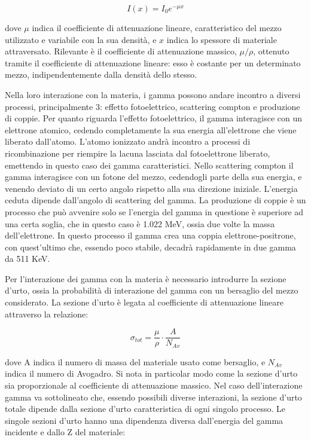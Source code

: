 \documentclass[a4paper,10pt]{article}
\begin{document}
\begin{equation}
	I(x)=I_{0}e^{-\mu x}
\end{equation}

\noindent dove $\mu$ indica il coefficiente di attenuazione lineare, caratteristico del mezzo utilizzato e variabile con la sua densità, e $x$ indica lo spessore di materiale attraversato. Rilevante \`e il coefficiente di attenuazione massico, $\mu/\rho$, ottenuto tramite il coefficiente di attenuazione lineare: esso \`e costante per un determinato mezzo, indipendentemente dalla densit\`a dello stesso. 

\noindent Nella loro interazione con la materia, i gamma possono andare incontro a diversi processi, principalmente 3: effetto fotoelettrico, scattering compton e produzione di coppie. Per quanto riguarda l'effetto fotoelettrico, il gamma interagisce con un elettrone atomico, cedendo completamente la sua energia all'elettrone che viene liberato dall'atomo. L'atomo ionizzato andr\`a incontro a processi di ricombinazione per riempire la lacuna lasciata dal fotoelettrone liberato, emettendo in questo caso dei gamma caratteristici. Nello scattering compton il gamma interagisce con un fotone del mezzo, cedendogli parte della sua energia, e venendo deviato di un certo angolo rispetto alla sua direzione iniziale. L'energia ceduta dipende dall'angolo di scattering del gamma. La produzione di coppie \`e un processo che pu\`o avvenire solo se l'energia del gamma in questione \`e superiore ad una certa soglia, che in questo caso \`e 1.022 MeV, ossia due volte la massa dell'elettrone. In questo processo il gamma crea una coppia elettrone-positrone, con quest'ultimo che, essendo poco stabile, decadr\`a rapidamente in due gamma da 511 KeV. 

\noindent Per l'interazione dei gamma con la materia \`e necessario introdurre la sezione d'urto, ossia la probabilit\`a di interazione del gamma con un bersaglio del mezzo considerato. La sezione d'urto \`e legata al coefficiente di attenuazione lineare attraverso la relazione:

\begin{equation}
	\sigma_{tot}=\frac{\mu}{\rho} \cdot \frac{A}{N_{Av}}
\end{equation}

\noindent dove A indica il numero di massa del materiale usato come bersaglio, e $N_{Av}$ indica il numero di Avogadro. Si nota in particolar modo come la sezione d'urto sia proporzionale al coefficiente di attenuazione massico. Nel caso dell'interazione gamma va sottolineato che, essendo possibili diverse interazioni, la sezione d'urto totale dipende dalla sezione d'urto caratteristica di ogni singolo processo. Le singole sezioni d'urto hanno una dipendenza diversa dall'energia del gamma incidente e dallo Z del materiale:
\end{document}
